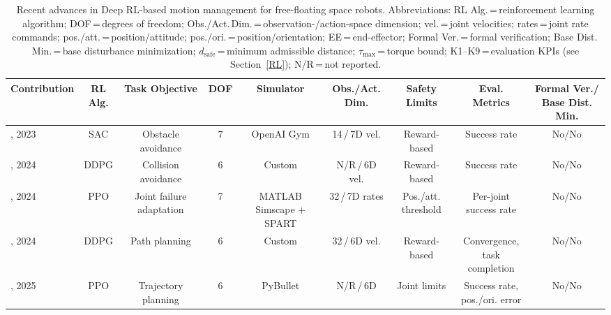 \documentclass{ieeeaccess}
\begin{document}
\begin{table}[!t]
	\centering
	\caption{Recent advances in Deep RL-based motion management for free-floating space robots.
  Abbreviations: RL Alg.\,=\,reinforcement learning algorithm; DOF\,=\,degrees of freedom;
  Obs./Act.\,Dim.\,=\,observation-/action-space dimension; vel.\,=\,joint velocities;
  rates\,=\,joint rate commands; pos./att.\,=\,position/attitude; pos./ori.\,=\,position/orientation;
  EE\,=\,end-effector; Formal Ver.\,=\,formal verification; Base Dist.\,Min.\,=\,base disturbance minimization;
  $d_\text{safe}$\,=\,minimum admissible distance; $\tau_\text{max}$\,=\,torque bound;
  K1--K9\,=\,evaluation KPIs (see Section~\ref{RL}); N/R\,=\,not reported.}
	\label{tab:sample}
	\scriptsize
	\renewcommand{\arraystretch}{1.25}
	\begin{tabular}{lcccccccc}
		\toprule
		\textbf{Contribution} & \makecell{\textbf{RL}\\\textbf{Alg.}} & \textbf{Task Objective} & \textbf{DOF} & \textbf{Simulator} & \makecell{\textbf{Obs./Act.}\\\textbf{Dim.}} & \makecell{\textbf{Safety}\\\textbf{Limits}} & \makecell{\textbf{Eval.}\\\textbf{Metrics}} & \makecell{\textbf{Formal Ver./}\\\textbf{Base Dist. Min.}} \\
		\midrule
		\cite{huang2023obstacle}, 2023 & SAC & Obstacle avoidance & 7 & OpenAI Gym & 14\,/\,7D vel. & Reward-based & Success rate & No/No \\
		\cite{al2024reinforcement}, 2024 & DDPG & Collision avoidance & 6 & Custom & N/R\,/\,6D vel. & Reward-based & Success rate & No/No \\
		\cite{d2024failure}, 2024 & PPO & \makecell{Joint failure\\adaptation} & 7 & \makecell{MATLAB\\Simscape + SPART} & 32\,/\,7D rates & \makecell{Pos./att.\\threshold} & \makecell{Per-joint\\success rate} & No/No \\
		\cite{al2024path}, 2024 & DDPG & Path planning & 6 & Custom & 32\,/\,6D vel. & Reward-based & \makecell{Convergence,\\task completion} & No/No \\
		\cite{hu2025deep}, 2025 & PPO & Trajectory planning & 6 & PyBullet & N/R\,/\,6D & Joint limits & \makecell{Success rate,\\pos./ori. error} & No/No \\

\end{tabular}
\end{table}
\end{document}
